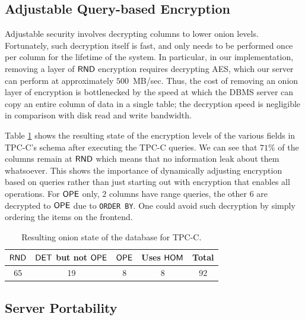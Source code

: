\subsection{Adjustable Query-based Encryption}



Adjustable security involves decrypting columns to lower onion levels.
Fortunately, such decryption itself is fast, and only needs to be
performed once per column for the lifetime of the system.  In particular,
in our implementation, removing a layer of $\mathsf{RND}$ encryption requires
decrypting AES, which our server can perform at approximately $500$~MB/sec.
Thus, the cost of removing an onion layer of encryption is
bottlenecked by the speed at which the DBMS server can copy an entire
column of data in a single table; the decryption speed is negligible in
comparison with disk read and write bandwidth.

Table \ref{t:onion} shows the resulting state of the encryption levels of
the various fields in TPC-C's schema after executing the TPC-C queries.
We can see that $71\%$ of the columns remain at
$\mathsf{RND}$ which means that no information leak about them whatsoever. This
shows the importance of dynamically adjusting encryption based on queries rather than
just starting out with encryption that enables all operations. For $\mathsf{OPE}$ only,
$2$ columns have range queries, the other $6$ are decrypted to $\mathsf{OPE}$ due to
\texttt{ORDER BY}. One could avoid such decryption by simply ordering the items
on the frontend.

\begin{table}
\centering
\begin{tabular}{c|c|c|c|c}
$\mathsf{RND}$ & $\mathsf{DET}$ but not $\mathsf{OPE}$ & $\mathsf{OPE}$ & Uses $\mathsf{HOM}$ & Total\\
\hline
 65 &  19 & 8 & 8 & 92 \\
\end{tabular}
\caption{Resulting onion state of the database for TPC-C.}
\label{t:onion}
\end{table}



\subsection{Server Portability}
\label{ss:mysqlport}


